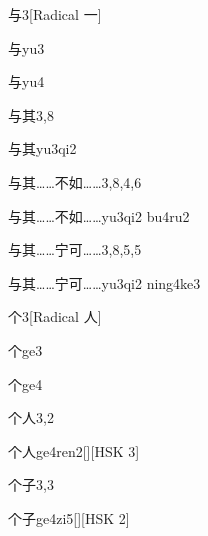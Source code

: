 \begin{entry}{与}{3}[Radical 一]
  \begin{phonetics}{与}{yu3}
  \end{phonetics}
  \begin{phonetics}{与}{yu4}
  \end{phonetics}
\end{entry}

\begin{entry}{与其}{3,8}
  \begin{phonetics}{与其}{yu3qi2}
  \end{phonetics}
\end{entry}

\begin{entry}{与其……不如……}{3,8,4,6}
  \begin{phonetics}{与其……不如……}{yu3qi2 bu4ru2}
  \end{phonetics}
\end{entry}

\begin{entry}{与其……宁可……}{3,8,5,5}
  \begin{phonetics}{与其……宁可……}{yu3qi2 ning4ke3}
  \end{phonetics}
\end{entry}

\begin{entry}{个}{3}[Radical 人]
  \begin{phonetics}{个}{ge3}
  \end{phonetics}
  \begin{phonetics}{个}{ge4}
  \end{phonetics}
\end{entry}

\begin{entry}{个人}{3,2}
  \begin{phonetics}{个人}{ge4ren2}[][HSK 3]
  \end{phonetics}
\end{entry}

\begin{entry}{个子}{3,3}
  \begin{phonetics}{个子}{ge4zi5}[][HSK 2]
  \end{phonetics}
\end{entry}

